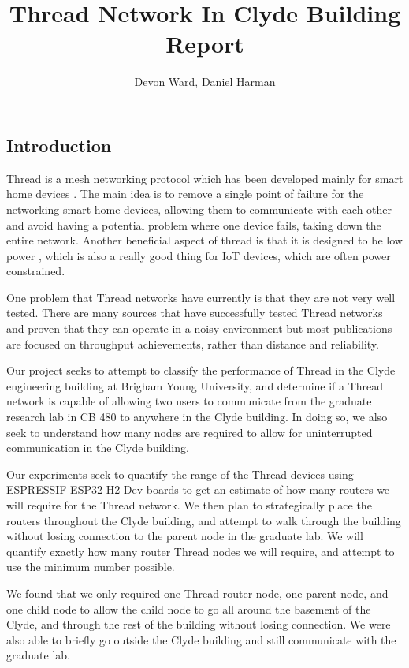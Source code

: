 \documentclass[letterpaper,twocolumn,10pt]{article}
\title{Thread Network In Clyde Building Report}
\author{Devon Ward, Daniel Harman}
\begin{document}
\maketitle

\subsection*{Introduction}

Thread is a mesh networking protocol which has been developed mainly for smart home devices \cite*{thread_website}. The main idea is to remove a single point of failure for the networking smart home devices, allowing them to communicate with each other and avoid having a potential problem where one device fails, taking down the entire network. Another beneficial aspect of thread is that it is designed to be low power \cite*{Thread_paper_1}, which is also a really good thing for IoT devices, which are often power constrained. 

One problem that Thread networks have currently is that they are not very well tested. There are many sources that have successfully tested Thread networks and proven that they can operate in a noisy environment but most publications are focused on throughput achievements, rather than distance and reliability.  

Our project seeks to attempt to classify the performance of Thread in the Clyde engineering building at Brigham Young University, and determine if a Thread network is capable of allowing two users to communicate from the graduate research lab in CB 480 to anywhere in the Clyde building. In doing so, we also seek to understand how many nodes are required to allow for uninterrupted communication in the Clyde building. 

Our experiments seek to quantify the range of the Thread devices using ESPRESSIF ESP32-H2 Dev boards \cite*{ESP32_h_board} to get an estimate of how many routers we will require for the Thread network. We then plan to strategically place the routers throughout the Clyde building, and attempt to walk through the building without losing connection to the parent node in the graduate lab. We will quantify exactly how many router Thread nodes we will require, and attempt to use the minimum number possible.

We found that we only required one Thread router node, one parent node, and one child node to allow the child node to go all around the basement of the Clyde, and through the rest of the building without losing connection. We were also able to briefly go outside the Clyde building and still communicate with the graduate lab. 
\end{document}
